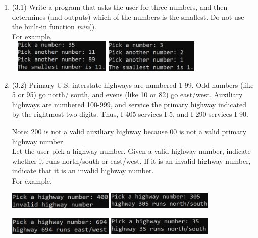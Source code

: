 \documentclass{article}
\begin{document}
\begin{enumerate}
\item (3.1)  
		Write a program that asks the user for three numbers, and then determines (and outputs)
		which of the numbers is the smallest.  Do not use the built-in function \textit{min}().\\
		For example, \\ \ \hfill
		\includegraphics[height = 0.6in]{./imgs/smallest_ex1.PNG} \hfill
		\includegraphics[height = 0.6in]{./imgs/smallest_ex2.PNG} \hfill \ 




\item (3.2)  
		Primary U.S. interstate highways are numbered 1-99.  Odd numbers (like 5 or 95) go north/
		south, and evens (like 10 or 82) go east/west.  Auxiliary highways are numbered 100-999, and 
		service the primary highway indicated by the rightmost two digits.  Thus, I-405 services 
		I-5, and I-290 services I-90.
		
		Note: 200 is not a valid auxiliary highway because 00 is not a valid primary highway 
		number.\\
		
		Let the user pick a highway number.  Given a valid highway number, indicate whether it runs 
		north/south or east/west.  If it is an invalid highway number, indicate that it is an 
		invalid highway number. \\
		For example,
		
		\hfill
		\includegraphics[width = 2in]{./imgs/highwayValidator1.PNG} \hfill
		\includegraphics[width = 2in]{./imgs/highwayValidator2.PNG} \hfill \ 

		\hfill 
		\includegraphics[width = 2in]{./imgs/highwayValidator3.PNG} \hfill 
		\includegraphics[width = 2in]{./imgs/highwayValidator4.PNG} \hfill \ 




\end{enumerate}
\end{document}
